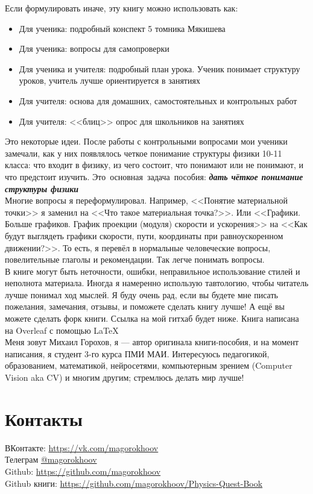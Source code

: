 \documentclass[12pt,a4paper]{report}
\begin{document}
Если формулировать иначе, эту книгу можно использовать как:
\begin{itemize}
\item Для ученика: подробный конспект 5 томника Мякишева
\item Для ученика: вопросы для самопроверки 
\item Для ученика и учителя: подробный план урока. Ученик понимает структуру уроков, учитель лучше ориентируется в занятиях
\item Для учителя: основа для домашних, самостоятельных и контрольных работ
\item Для учителя: <<блиц>> опрос для школьников на занятиях
\end{itemize}

Это некоторые идеи. После работы с контрольными вопросами мои ученики замечали, как у них появлялось четкое понимание структуры физики 10-11 класса: что входит в физику, из чего состоит, что понимают или не понимают, и что предстоит изучить. Это~основная~задача~пособия: \textbf{\textsl{дать чёткое понимание структуры физики}} \\

Многие вопросы я переформулировал. Например, <<Понятие материальной точки>> я заменил на <<Что такое материальная точка?>>. Или <<Графики. Больше графиков. График проекции (модуля) скорости и ускорения>> на <<Как будут выглядеть графики скорости, пути, координаты при равноускоренном движении?>>. То есть, я перевёл в нормальные человеческие вопросы, повелительные глаголы и рекомендации. Так легче понимать вопросы. \\

В книге могут быть неточности, ошибки, неправильное использование стилей и неполнота материала. Иногда я намеренно использую тавтологию, чтобы читатель лучше понимал ход мыслей. Я буду очень рад, если вы будете мне писать пожелания, замечания, отзывы, и поможете сделать книгу лучше! А ещё вы можете сделать форк книги. Ссылка на мой гитхаб будет ниже. Книга написана на Overleaf с помощью \LaTeX \\

Меня зовут Михаил Горохов, я --- автор оригинала книги-пособия, и на момент написания, я студент 3-го курса ПМИ МАИ. Интересуюсь педагогикой, образованием, математикой, нейросетями, компьютерным зрением (Computer Vision aka CV) и многим другим; стремлюсь делать мир лучше!


\section{Контакты}
ВКонтакте: \href{https://vk.com/magorokhoov}{https://vk.com/magorokhoov} \\
Телеграм \href{https://t.me/magorokhoov}{@magorokhoov} \\
Github: \href{https://github.com/magorokhoov}{https://github.com/magorokhoov}\\
Github книги: \href{https://github.com/magorokhoov/Physics-Quest-Book}{https://github.com/magorokhoov/Physics-Quest-Book}\\
\end{document}
